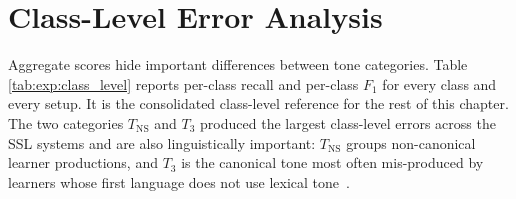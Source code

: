 \section{Class-Level Error Analysis}
\label{sec:exp:class_level}

Aggregate scores hide important differences between tone categories. Table
\ref{tab:exp:class_level} reports per-class recall and per-class \(F_1\) for
every class and every setup. It is the consolidated class-level reference for
the rest of this chapter. The two categories \(T_{\mathrm{NS}}\) and
\(T_3\) produced the largest class-level errors across the SSL systems and are
also linguistically important: \(T_{\mathrm{NS}}\) groups non-canonical
learner productions, and \(T_3\) is the canonical tone most often
mis-produced by learners whose first language does not use lexical
tone~\cite{hao2012}.

